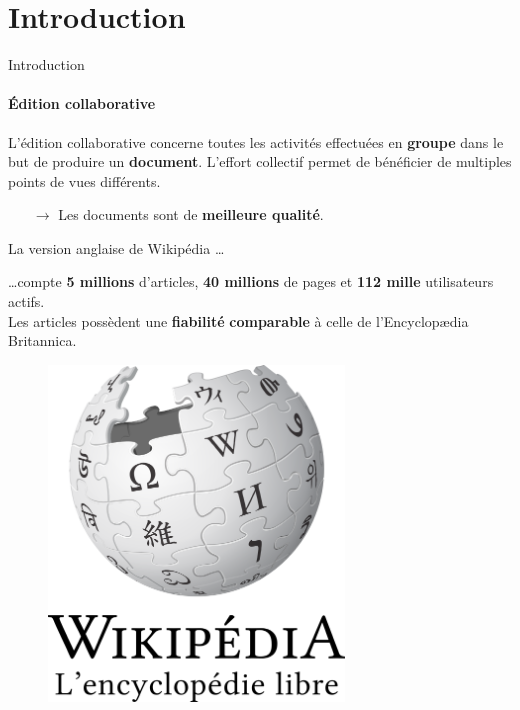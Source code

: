 \section{Introduction}


\begin{frame}{Introduction}\framesubtitle{Édition collaborative}

  L'édition collaborative concerne toutes les activités effectuées en
  \textbf{groupe} dans le but de produire un \textbf{document}. L'effort
  collectif permet de bénéficier de multiples points de vues différents.

  \begin{itemize}
  \item[$\rightarrow$] Les documents sont de \textbf{meilleure qualité}.
  \end{itemize}
  
  \vspace{0.25cm}

  \noindent
  \begin{exampleblock}{La version anglaise de Wikipédia \ldots}
  \begin{minipage}{0.6\textwidth}
    \ldots compte \textbf{5 millions} d'articles, \textbf{40 millions}
      de pages et \textbf{112 mille} utilisateurs actifs.\\Les articles
      possèdent une \textbf{fiabilité} \textbf{comparable} à celle de
      l'Encyclopædia Britannica.
  \end{minipage}
  \hfill
  \begin{minipage}{0.3\textwidth}
    \begin{figure}
      \begin{center}
        \includegraphics[width=0.7\textwidth]{img/wikipedia.png}
      \end{center}
    \end{figure}
  \end{minipage}
  \end{exampleblock}

\end{frame}


